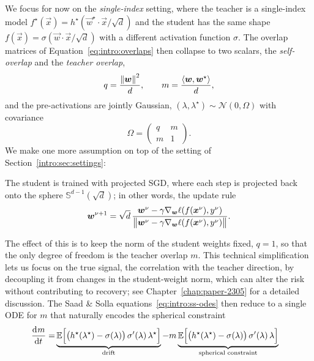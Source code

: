 We focus for now on the \emph{single-index} setting, where the teacher is a single-index model \(f^\star(\vec{x}) = h^\star(\vec{w}^\star \cdot \vec{x}/\sqrt{d})\) and the student has the same shape \(f(\vec{x}) = \sigma(\vec{w} \cdot \vec{x}/\sqrt{d})\) with a different activation function \(\sigma\). The overlap matrices of Equation~\eqref{eq:intro:overlaps} then collapse to two scalars, the \emph{self-overlap} and the \emph{teacher overlap},
\begin{equation}
\label{eq:intro:single-index-overlaps}
    q = \frac{\left\lVert {\boldsymbol{w}}\right\rVert^2}{d}, \qquad m = \frac{\langle {\boldsymbol{w}}, {\boldsymbol{w}}^\star\rangle}{d},
\end{equation}
and the pre-activations are jointly Gaussian, \((\lambda, \lambda^\star) \sim \mathcal{N}(0, \Omega)\) with covariance \[\Omega = \left(\begin{smallmatrix} q & m \\ m & 1\end{smallmatrix}\right).\]
We make one more assumption on top of the setting of Section~\ref{intro:sec:settings}:
\begin{assumption}
    The student is trained with projected SGD, where each step is projected back onto the sphere \(\mathbb{S}^{d-1}(\sqrt{d})\); in other words, the update rule
    \[{\boldsymbol{w}}^{\nu+1} = \sqrt{d}\,\frac{{\boldsymbol{w}}^{\nu} - \gamma \nabla_{{\boldsymbol{w}}}\ell(f({\boldsymbol{x}}^{\nu}), y^{\nu})}{\left\lVert {\boldsymbol{w}}^{\nu} - \gamma \nabla_{{\boldsymbol{w}}}\ell(f({\boldsymbol{x}}^{\nu}), y^{\nu})\right\rVert}.\]
\end{assumption}
The effect of this is to keep the norm of the student weights fixed, \(q = 1\), so that the only degree of freedom is the teacher overlap \(m\).
This technical simplification lets us focus on the true signal, the correlation with the teacher direction, by decoupling it from changes in the student-weight norm, which can alter the risk without contributing to recovery; see Chapter~\ref{chap:paper-2305} for a detailed discussion.
The Saad \& Solla equations~\eqref{eq:intro:ss-odes} then reduce to a single ODE for \(m\) that naturally encodes the spherical constraint
\begin{equation} \label{eq:intro:m-ode-sphere}
\begin{aligned}
    \dod{m}{t} =& \underbrace{\mathbb{E}\!\left[ \left( h^\star(\lambda^\star) - \sigma(\lambda) \right) \sigma'(\lambda)\,\lambda^\star \right]}_{\text{drift}}
                -m\underbrace{\mathbb{E}\!\left[ \left( h^\star(\lambda^\star) - \sigma(\lambda) \right) \sigma'(\lambda)\,\lambda \right]}_{\text{spherical constraint}}
\end{aligned}
\end{equation}
